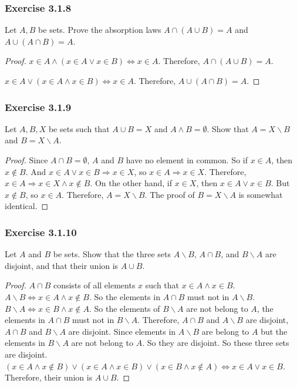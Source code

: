 \documentclass[12pt, letter]{article}
\begin{document}
\subsubsection*{Exercise 3.1.8}
Let $A,B$ be sets. Prove the absorption laws $A\cap(A\cup B)=A$ and $A\cup(A\cap B)=A$.
\begin{proof}
    $x\in A\land (x\in A\lor x\in B)\iff x\in A$. Therefore, $A\cap(A\cup B)=A$.

    $x\in A\lor(x\in A\land x\in B) \iff x\in A$. Therefore, $A\cup(A\cap B)=A$.
\end{proof}
\subsubsection*{Exercise 3.1.9}
Let $A,B,X$ be sets such that $A\cup B=X$ and $A\land B=\emptyset$. Show that $A=X\backslash B$ and $B=X\backslash A$.
\begin{proof}
    Since $A\cap B=\emptyset$, $A$ and $B$ have no element in common. So if $x\in A$, then $x\notin B$. And $x\in A\lor x\in B\Rightarrow x\in X$, so $x\in A\Rightarrow x\in X$. Therefore, $x\in A\Rightarrow x\in X\land x\notin B$.
    On the other hand, if $x\in X$, then $x\in A\lor x\in B$. But $x\notin B$, so $x\in A$. Therefore, $A=X\backslash B$.
    The proof of $B=X\backslash A$ is somewhat identical. 
\end{proof}
\subsubsection*{Exercise 3.1.10}
Let $A$ and $B$ be sets. Show that the three sets $A\backslash B$, $A\cap B$, and $B\backslash A$ are disjoint, and that their union is $A\cup B$.
\begin{proof}
    $A\cap B$ consists of all elements $x$ such that $x\in A\land x\in B$. $A\backslash B\iff x\in A\land x\notin B$. So the elements in $A\cap B$ must not in $A\backslash B$. 
    $B\backslash A\iff x\in B\land x\notin A$. So the elements of $B\backslash A$ are not belong to $A$, the elements in $A\cap B$ must not in $B\backslash A$. Therefore, $A\cap B$ and $A\backslash B$ are disjoint,
    $A\cap B$ and $B\backslash A$ are disjoint. Since elements in $A\backslash B$ are belong to $A$ but the elements in $B\backslash A$ are not belong to $A$. So they are disjoint. 
    So these three sets are disjoint. $(x\in A\land x\notin B)\lor(x\in A\land x\in B)\lor(x\in B\land x\notin A)\iff x\in A\lor x\in B$. Therefore, their union is $A\cup B$.
\end{proof}
\end{document}

